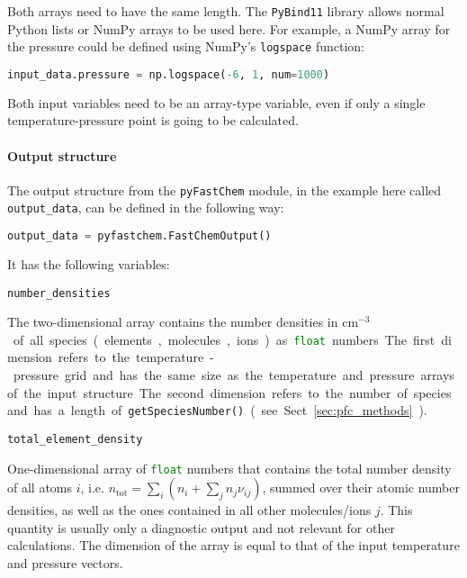 \documentclass[numbers=noenddot]{aux/fcmanual}
\newcommand{\pfc}{\texttt{pyFastChem}\xspace}
\newcommand{\pb}{\texttt{PyBind11}\xspace}
\begin{document}
\bigbreak

Both arrays need to have the same length. The \pb library allows normal Python lists or NumPy arrays to be used here. For example, a NumPy array for the pressure could be defined using NumPy's \lstinline!logspace! function:

\begin{lstlisting}[language=Python]
  input_data.pressure = np.logspace(-6, 1, num=1000)
\end{lstlisting}
Both input variables need to be an array-type variable, even if only a single temperature-pressure point is going to be calculated.

\paragraph{Output structure}
The output structure from the \pfc module, in the example here called \lstinline!output_data!, can be defined in the following way:
\begin{lstlisting}[language=Python]
  output_data = pyfastchem.FastChemOutput()
\end{lstlisting}

It has the following variables:

\lstinline!number_densities!
\begin{addmargin}[25pt]{0pt}
	The two-dimensional array contains the number densities in \unit{cm$^{-3}$} of all species (elements, molecules, ions) as \lstinline[language=Python]!float! numbers. The first dimension refers to the temperature-pressure grid and has the same size as the temperature and pressure arrays of the input structure. The second dimension refers to the number of species and has a length of \lstinline!getSpeciesNumber()! (see Sect. \ref{sec:pfc_methods}).
\end{addmargin}

\bigbreak

\lstinline!total_element_density!
\begin{addmargin}[25pt]{0pt}
	One-dimensional array of \lstinline[language=Python]!float! numbers that contains the total number density of all atoms $i$, i.e. $n_\mathrm{tot} = \sum_i \left( n_i + \sum_j n_j \nu_{ij} \right)$, summed over their atomic number densities, as well as the ones contained in all other molecules/ions $j$. This quantity is usually only a diagnostic output and not relevant for other calculations. The dimension of the array is equal to that of the input temperature and pressure vectors.
\end{addmargin}
\end{document}

